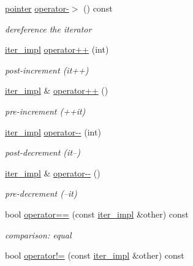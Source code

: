 \begin{DoxyCompactItemize}
\hyperlink{classnlohmann_1_1detail_1_1iter__impl_a69e52f890ce8c556fd68ce109e24b360}{pointer} \hyperlink{classnlohmann_1_1detail_1_1iter__impl_a28a0c92903edd8f86825c8c7784b0913}{operator-\/$>$} () const 
\begin{DoxyCompactList}\small\item\em dereference the iterator \end{DoxyCompactList}\item 
\hyperlink{classnlohmann_1_1detail_1_1iter__impl}{iter\+\_\+impl} \hyperlink{classnlohmann_1_1detail_1_1iter__impl_ae64452217b17567717039a158f8bc029}{operator++} (int)
\begin{DoxyCompactList}\small\item\em post-\/increment (it++) \end{DoxyCompactList}\item 
\hyperlink{classnlohmann_1_1detail_1_1iter__impl}{iter\+\_\+impl} \& \hyperlink{classnlohmann_1_1detail_1_1iter__impl_abdfe2a7f464400a7ab572782d14b922f}{operator++} ()
\begin{DoxyCompactList}\small\item\em pre-\/increment (++it) \end{DoxyCompactList}\item 
\hyperlink{classnlohmann_1_1detail_1_1iter__impl}{iter\+\_\+impl} \hyperlink{classnlohmann_1_1detail_1_1iter__impl_ab8479a4395bb0ab3661d842a9ee47767}{operator-\/-\/} (int)
\begin{DoxyCompactList}\small\item\em post-\/decrement (it--) \end{DoxyCompactList}\item 
\hyperlink{classnlohmann_1_1detail_1_1iter__impl}{iter\+\_\+impl} \& \hyperlink{classnlohmann_1_1detail_1_1iter__impl_a84e689fb581d651d130039f7cb81494a}{operator-\/-\/} ()
\begin{DoxyCompactList}\small\item\em pre-\/decrement (--it) \end{DoxyCompactList}\item 
bool \hyperlink{classnlohmann_1_1detail_1_1iter__impl_abe91c77d1be747fadcbfaf6f685e3ee7}{operator==} (const \hyperlink{classnlohmann_1_1detail_1_1iter__impl}{iter\+\_\+impl} \&other) const 
\begin{DoxyCompactList}\small\item\em comparison\+: equal \end{DoxyCompactList}\item 
bool \hyperlink{classnlohmann_1_1detail_1_1iter__impl_a66af27bbbf9743bc000264a0f89c5d0d}{operator!=} (const \hyperlink{classnlohmann_1_1detail_1_1iter__impl}{iter\+\_\+impl} \&other) const 

\end{DoxyCompactItemize}
